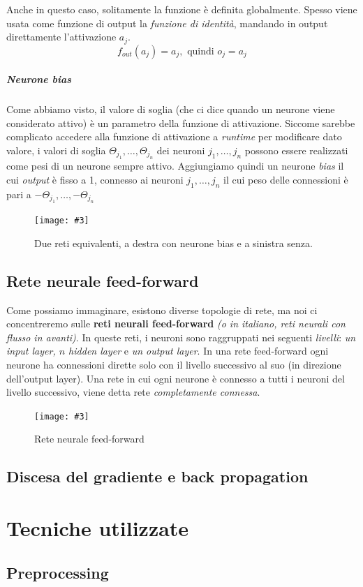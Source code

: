 \documentclass[12pt, twoside, letterpaper]{report}
\newcommand{\img}[3] {
	\begin{figure}[h]
		\caption{#1}
		\centering
		\texttt{[image: \#3]}\\
	\end{figure}
}
\begin{document}
			 	Anche in questo caso, solitamente la funzione è definita globalmente. Spesso viene usata come funzione di output la \textit{funzione di identità}, mandando in output direttamente l'attivazione $a_j$. $$f_{out}(a_j) = a_j, \text{ quindi } o_j = a_j$$
			 	
			 \paragraph{Neurone bias} Come abbiamo visto, il valore di soglia (che ci dice quando un neurone viene considerato attivo) è un parametro della funzione di attivazione. Siccome sarebbe complicato accedere alla funzione di attivazione a \textit{runtime} per modificare dato valore, i valori di soglia $\Theta_{j_1}, \dots, \Theta_{j_n}$ dei neuroni $j_1, \dots, j_n$ possono essere realizzati come pesi di un neurone sempre attivo. Aggiungiamo quindi un neurone \textit{bias} il cui \textit{output} è fisso a 1, connesso ai neuroni $j_1, \dots, j_n$ il cui peso delle connessioni è pari a $-\Theta_{j_1}, \dots, -\Theta_{j_n}$
			 
			 	\img{Due reti equivalenti, a destra con neurone bias e a sinistra senza.}{0.5}{bias-neuron.png}
			 
		\section{Rete neurale feed-forward}
			Come possiamo immaginare, esistono diverse topologie di rete, ma noi ci concentreremo sulle \textbf{reti neurali feed-forward} \textit{(o in italiano, reti neurali con flusso in avanti)}. In queste reti, i neuroni sono raggruppati nei seguenti \textit{livelli}: \textit{un input layer, $n$ hidden layer} e \textit{un output layer}. In una rete feed-forward ogni neurone ha connessioni dirette solo con il livello successivo al suo (in direzione dell'output layer). Una rete in cui ogni neurone è connesso a tutti i neuroni del livello successivo, viene detta rete \textit{completamente connessa}.
			\img{Rete neurale feed-forward}{0.4}{nn-feed-forward.png}
		\section{Discesa del gradiente e back propagation}
		
	\chapter{Tecniche utilizzate}
		\section{Preprocessing}
\end{document}
